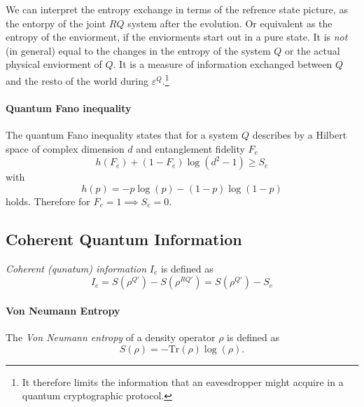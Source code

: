 We can interpret the entropy exchange in terms of the refrence state picture, 
as the entorpy of the joint $RQ$ system after the evolution.
Or equivalent as the entropy of the enviorment, if the enviorments start out in a pure state. 
It is \textit{not} (in general) equal to the changes in the entropy of the system $Q$ or the actual physical enviorment of $Q$. 
It is a measure of information exchanged between $Q$ and the resto of the world during $\varepsilon^Q$.\footnote{
    It therefore limits the information that an eavesdropper might acquire in a quantum cryptographic protocol.
} \cite{qDataProcessing}

\paragraph{Quantum Fano inequality}
The quantum Fano inequality states that for a system $Q$ describes by a Hilbert space of complex dimension $d$ 
and entanglement fidelity $F_e$
\begin{equation}
    h(F_e) +(1-F_e) \log(d^2-1) \ge S_e
\end{equation} 
with
\begin{equation}
    h(p) = -p \log(p) -(1-p) \log(1-p)
\end{equation}
holds.
Therefore for $F_e=1\implies S_e=0$. 

\subsection{Coherent Quantum Information}

\textit{Coherent (qunatum) information} $I_e$ is defined as 
\begin{equation}
    I_e = S(\rho^{Q'}) - S(\rho^{RQ'}) = S(\rho^{Q'}) - S_e
\end{equation}


\paragraph{Von Neumann Entropy}
The \textit{Von Neumann entropy} of a density operator $\rho$ is defined as 
\begin{equation}
    S(\rho) = - \text{Tr}(\rho) \log(\rho).
\end{equation}